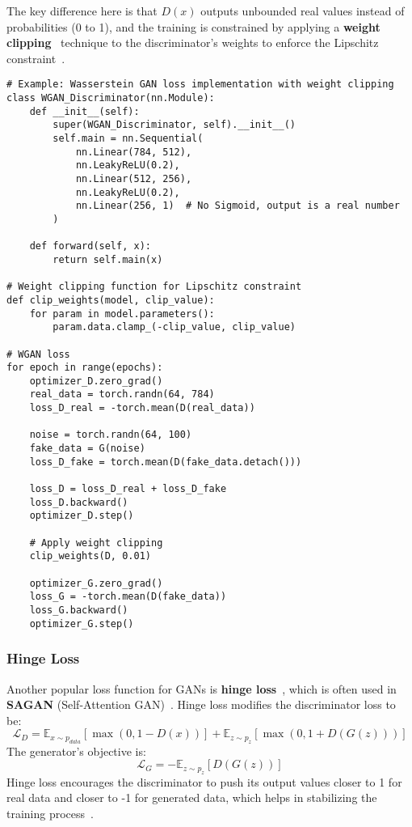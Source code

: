 The key difference here is that \(D(x)\) outputs unbounded real values instead of probabilities (0 to 1), and the training is constrained by applying a \textbf{weight clipping}~\cite{han2019dimension, elsayed2024weight} technique to the discriminator's weights to enforce the Lipschitz constraint~\cite{li2019preventing}.

\begin{lstlisting}[style=python]
# Example: Wasserstein GAN loss implementation with weight clipping
class WGAN_Discriminator(nn.Module):
    def __init__(self):
        super(WGAN_Discriminator, self).__init__()
        self.main = nn.Sequential(
            nn.Linear(784, 512),
            nn.LeakyReLU(0.2),
            nn.Linear(512, 256),
            nn.LeakyReLU(0.2),
            nn.Linear(256, 1)  # No Sigmoid, output is a real number
        )

    def forward(self, x):
        return self.main(x)

# Weight clipping function for Lipschitz constraint
def clip_weights(model, clip_value):
    for param in model.parameters():
        param.data.clamp_(-clip_value, clip_value)

# WGAN loss
for epoch in range(epochs):
    optimizer_D.zero_grad()
    real_data = torch.randn(64, 784)
    loss_D_real = -torch.mean(D(real_data))
    
    noise = torch.randn(64, 100)
    fake_data = G(noise)
    loss_D_fake = torch.mean(D(fake_data.detach()))
    
    loss_D = loss_D_real + loss_D_fake
    loss_D.backward()
    optimizer_D.step()
    
    # Apply weight clipping
    clip_weights(D, 0.01)

    optimizer_G.zero_grad()
    loss_G = -torch.mean(D(fake_data))
    loss_G.backward()
    optimizer_G.step()
\end{lstlisting}

\subsubsection{Hinge Loss}
Another popular loss function for GANs is \textbf{hinge loss}~\cite{gentile1998linear, bartlett2008classification}, which is often used in \textbf{SAGAN} (Self-Attention GAN)~\cite{zhang2019self}. Hinge loss modifies the discriminator loss to be:
\[
\mathcal{L}_D = \mathbb{E}_{x \sim p_{data}}[\max(0, 1 - D(x))] + \mathbb{E}_{z \sim p_z}[\max(0, 1 + D(G(z)))]
\]
The generator's objective is:
\[
\mathcal{L}_G = -\mathbb{E}_{z \sim p_z} [D(G(z))]
\]
Hinge loss encourages the discriminator to push its output values closer to 1 for real data and closer to -1 for generated data, which helps in stabilizing the training process~\cite{bartlett2008classification, zhang2019self}.

